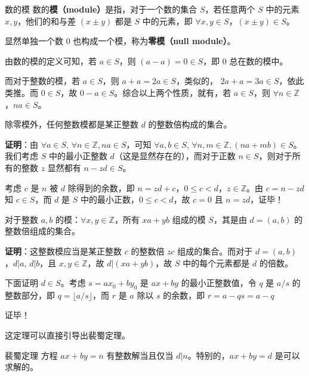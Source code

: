 \begin{definition}{数的模}
数的\textbf{模（module）}是指，对于一个数的集合 $S$，若任意两个 $S$ 中的元素 $x, y$，他们的和与差 $(x\pm y)$ 都是 $S$ 中的元素，即 $\forall x, y \in S$，$(x \pm y) \in S$。
\end{definition}
显然单独一个数 $0$ 也构成一个模，称为\textbf{零模（null module）}。

由数的模的定义可知，若 $a \in S$，则 $(a-a)=0 \in S$，即 $0$ 总在数的模中。

而对于整数的模，若 $a \in S$，则 $a + a = 2a\in S$，类似的， $2a + a = 3a\in S$，依此类推。而 $0 \in S$，故 $0 - a \in S$。综合以上两个性质，就有，若 $a \in S$，则 $\forall n \in \mathbb Z$，$na \in S$。

\begin{theorem}{}
除零模外，任何整数模都是某正整数 $d$ 的整数倍构成的集合。
\end{theorem}
\textbf{证明}：由 $\forall a \in S$, $\forall n \in \mathbb Z, na \in S$，可知 $\forall a, b \in S$, $\forall n, m \in \mathbb Z, (na+mb) \in S$。我们考虑 $S$ 中的最小正整数 $d$（这是显然存在的），而对于正数 $n \in S$，则对于所有的整数 $z$ 显然都有 $n - zd \in S$。

考虑 $c$ 是 $n$ 被 $d$ 除得到的余数，即 $n = zd + c$，$0 \le c < d$，$z \in \mathbb Z$。由 $c = n - zd$ 知 $c \in S$，而 $d$ 是 $S$ 中的最小正数，$0 \le c < d$，故 $c = 0$ 且 $n = zd$，证毕！

\begin{theorem}{}
对于整数 $a, b$ 的模：$\forall x, y \in \mathbb Z$，所有 $xa+yb$ 组成的模 $S$，其是由 $d=(a, b)$ 的整数倍组成的集合。
\end{theorem}
\textbf{证明}：这整数模应当是某正整数 $c$ 的整数倍 $zc$ 组成的集合。而对于 $d = (a, b)$，$d | a$, $d | b$，且 $x, y \in \mathbb Z$，故 $d | (xa+yb)$，故 $S$ 中的每个元素都是 $d$ 的倍数。

下面证明 $d \in S$。考虑 $s=a x_0 + b y_0$ 是 $ax+by$ 的最小正整数值，令 $q$ 是 $a/s$ 的整数部分，即 $q = \lfloor a/s \rfloor$，而 $r$ 是 $a$ 除以 $s$ 的余数，即 $r = a - q s = a - q $

证毕！

这定理可以直接引导出裴蜀定理。
\begin{theorem}{裴蜀定理}
方程 $ax + by = n$ 有整数解当且仅当 $d | n$。特别的，$ax+by = d$ 是可以求解的。
\end{theorem}
